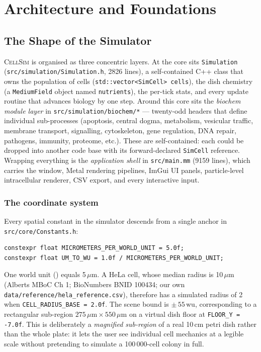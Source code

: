 \documentclass[11pt,letterpaper,twoside,openany]{book}
\newcommand{\code}[1]{\texttt{#1}}
\newcommand{\file}[1]{\texttt{\small#1}}
\newcommand{\wu}{\text{wu}}
\newcommand{\um}{\ensuremath{\mu\text{m}}}
\begin{document}
\part{Architecture and Foundations}

\chapter{The Shape of the Simulator}
\label{ch:arch}

\textsc{CellSim} is organised as three concentric layers. At the core
sits \code{Simulation} (\file{src/simulation/Simulation.h}, 2826
lines), a self-contained C++ class that owns the population of cells
(\code{std::vector<SimCell> cells}), the dish chemistry (a
\code{MediumField} object named \code{nutrients}), the per-tick stats,
and every update routine that advances biology by one step. Around
this core sits the \emph{biochem module layer} in
\file{src/simulation/biochem/*} --- twenty-odd headers that define
individual sub-processes (apoptosis, central dogma, metabolism,
vesicular traffic, membrane transport, signalling, cytoskeleton,
gene regulation, DNA repair, pathogens, immunity, proteome, etc.).
These are self-contained: each could be dropped into another code
base with its forward-declared \code{SimCell} reference. Wrapping
everything is the \emph{application shell} in \file{src/main.mm}
(9159 lines), which carries the window, Metal rendering pipelines,
ImGui UI panels, particle-level intracellular renderer, CSV export,
and every interactive input.

\section{The coordinate system}
\label{sec:coord}

Every spatial constant in the simulator descends from a single anchor
in \file{src/core/Constants.h}:
\begin{lstlisting}
constexpr float MICROMETERS_PER_WORLD_UNIT = 5.0f;
constexpr float UM_TO_WU = 1.0f / MICROMETERS_PER_WORLD_UNIT;
\end{lstlisting}
One world unit (\wu) equals 5\,\um. A HeLa cell, whose median radius
is 10\,\um (Alberts MBoC Ch 1; BioNumbers BNID 100434; our own
\file{data/reference/hela\_reference.csv}), therefore has a simulated
radius of 2\,\wu when \code{CELL\_RADIUS\_BASE = 2.0f}. The scene
bound is $\pm\,55\,\wu$, corresponding to a rectangular sub-region
$275\,\um \times 550\,\um$ on a virtual dish floor at
\code{FLOOR\_Y = -7.0f}. This is deliberately a \emph{magnified
sub-region} of a real 10\,cm petri dish rather than the whole plate:
it lets the user see individual cell mechanics at a legible scale
without pretending to simulate a 100\,000-cell colony in full.
\end{document}
